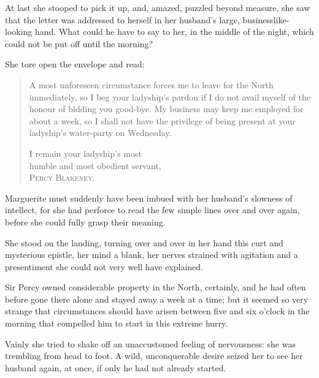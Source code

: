 At last she stooped to pick it up, and, amazed, puzzled beyond measure, she saw that the letter was addressed to herself in her husband's large, businesslike-looking hand. What could he have to say to her, in the middle of the night, which could not be put off until the morning?

She tore open the envelope and read:\longdash

\begin{quotation}
\indent A most unforeseen circumstance forces me to leave for the North immediately, so I beg your ladyship's pardon if I do not avail myself of the honour of bidding you good-bye. My business may keep me employed for about a week, so I shall not have the privilege of being present at your ladyship's water-party on Wednesday.\\
\begin{flushright}
I remain your ladyship's most\\ humble and most obedient servant,\\
\vspace{5pt}
\textsc{Percy Blakeney.}
\end{flushright}
\end{quotation}

Marguerite must suddenly have been imbued with her husband's slowness of intellect, for she had perforce to read the few simple lines over and over again, before she could fully grasp their meaning.

She stood on the landing, turning over and over in her hand this curt and mysterious epistle, her mind a blank, her nerves strained with agitation and a presentiment she could not very well have explained.

Sir Percy owned considerable property in the North, certainly, and he had often before gone there alone and stayed away a week at a time; but it seemed so very strange that circumstances should have arisen between five and six o'clock in the morning that compelled him to start in this extreme hurry.

Vainly she tried to shake off an unaccustomed feeling of nervousness: she was trembling from head to foot. A wild, unconquerable desire seized her to see her husband again, at once, if only he had not already started.

